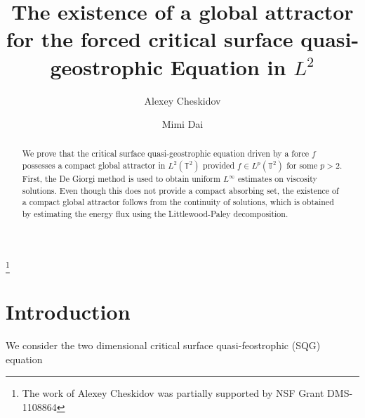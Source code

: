 \documentclass{amsart}
\numberwithin{Theorem}{section}
\theoremstyle{definition}
\theoremstyle{remark}
\begin{document}

\title[Global Attractor of SQG in $L^2$]{The existence of a global attractor for the forced critical surface quasi-geostrophic Equation in $L^2$}


\author[Alexey Cheskidov]{ Alexey Cheskidov }
\address{Department of Mathematics, University of Illinois, Chicago, IL 60607,USA}

\author[Mimi Dai]{ Mimi Dai}
\address{Department of Mathematics, University of Illinois, Chicago, IL 60607,USA}


\thanks{The work of Alexey Cheskidov was partially supported by NSF Grant DMS-1108864}



\begin{abstract}
We prove that the critical surface quasi-geostrophic equation driven by a force $f$ possesses a compact global attractor in $L^2(\mathbb T^2)$ provided
$f\in L^p(\mathbb T^2)$ for some $p>2$. First, the De Giorgi method is
used to obtain uniform $L^\infty$ estimates on viscosity solutions. Even though
this does not provide  a compact absorbing set, the existence
of a compact global attractor follows from the continuity of solutions, which is
obtained by estimating the energy flux using the Littlewood-Paley decomposition.

\end{abstract}

\maketitle

\section{Introduction}
We consider the two dimensional critical surface quasi-feostrophic (SQG) equation
\end{document}
